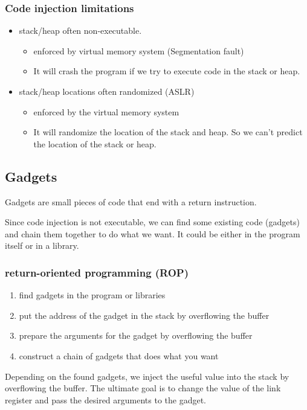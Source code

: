 \documentclass[letterpaper,12pt]{article}
\begin{document}
\subsubsection{Code injection limitations}
\begin{itemize}
    \item stack/heap often non-executable.\begin{itemize}
              \item enforced by virtual memory system (Segmentation fault)
              \item It will crash the program if we try to execute code in the stack or heap.
          \end{itemize}
    \item stack/heap locations often randomized (ASLR) \begin{itemize}
              \item enforced by the virtual memory system
              \item It will randomize the location of the stack and heap. So we can't predict the
                    location of the stack or heap.
          \end{itemize}
\end{itemize}

\subsection{Gadgets}
Gadgets are small pieces of code that end with a return instruction.

Since code injection is not executable, we can find some existing code
(gadgets) and chain them together to do what we want. It could be either in the
program itself or in a library.

\subsubsection{return-oriented programming (ROP)}
\begin{enumerate}
    \item find gadgets in the program or libraries
    \item put the address of the gadget in the stack by overflowing the buffer
    \item prepare the arguments for the gadget by overflowing the buffer
    \item construct a chain of gadgets that does what you want
\end{enumerate}
Depending on the found gadgets, we inject the useful value into the stack by overflowing the buffer. The ultimate goal is to change the value of the link register and pass the desired arguments to the gadget.
\end{document}
